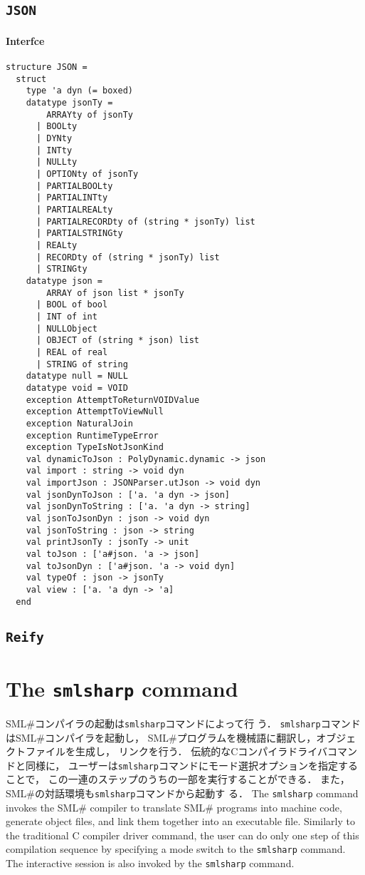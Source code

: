 \documentclass{jbook}
\newcommand{\txt}[2]{#2}
\newcommand{\smlsharp}{SML\#}
\newcommand{\structure}[1]{
\section{{\tt #1}}\label{section:reference:#1}
}
\newcommand{\Interface}{\subsubsection*{\txt{インタフェイス}{Interfce}}}
\begin{document}
\structure{JSON}
\Interface
\begin{verbatim}
structure JSON =
  struct
    type 'a dyn (= boxed)
    datatype jsonTy =
        ARRAYty of jsonTy
      | BOOLty
      | DYNty
      | INTty
      | NULLty
      | OPTIONty of jsonTy
      | PARTIALBOOLty
      | PARTIALINTty
      | PARTIALREALty
      | PARTIALRECORDty of (string * jsonTy) list
      | PARTIALSTRINGty
      | REALty
      | RECORDty of (string * jsonTy) list
      | STRINGty
    datatype json =
        ARRAY of json list * jsonTy
      | BOOL of bool
      | INT of int
      | NULLObject
      | OBJECT of (string * json) list
      | REAL of real
      | STRING of string
    datatype null = NULL
    datatype void = VOID
    exception AttemptToReturnVOIDValue
    exception AttemptToViewNull
    exception NaturalJoin
    exception RuntimeTypeError
    exception TypeIsNotJsonKind
    val dynamicToJson : PolyDynamic.dynamic -> json
    val import : string -> void dyn
    val importJson : JSONParser.utJson -> void dyn
    val jsonDynToJson : ['a. 'a dyn -> json]
    val jsonDynToString : ['a. 'a dyn -> string]
    val jsonToJsonDyn : json -> void dyn
    val jsonToString : json -> string
    val printJsonTy : jsonTy -> unit
    val toJson : ['a#json. 'a -> json]
    val toJsonDyn : ['a#json. 'a -> void dyn]
    val typeOf : json -> jsonTy
    val view : ['a. 'a dyn -> 'a]
  end
\end{verbatim}

\structure{Reify}

\chapter{\txt{\smlsharp{}コンパイラの起動}{The {\tt smlsharp} command}}
\label{chap:reference:command}

\ifjp%
	\smlsharp{}コンパイラの起動は{\tt smlsharp}コマンドによって行
	う．
	{\tt smlsharp}コマンドは\smlsharp{}コンパイラを起動し，
\smlsharp{}プログラムを機械語に翻訳し，オブジェクトファイルを生成し，
リンクを行う．
	伝統的なCコンパイラドライバコマンドと同様に，
ユーザーは{\tt smlsharp}コマンドにモード選択オプションを指定することで，
この一連のステップのうちの一部を実行することができる．
	また，\smlsharp{}の対話環境も{\tt smlsharp}コマンドから起動す
る．
\else%
	The {\tt smlsharp} command invokes the \smlsharp{} compiler
to translate \smlsharp{} programs into machine code,
generate object files, and
link them together into an executable file.
	Similarly to the traditional C compiler driver command,
the user can do only one step of this compilation sequence
by specifying a mode switch to the {\tt smlsharp} command.
	The interactive session is also invoked by the {\tt smlsharp}
command.
\fi%
\end{document}
